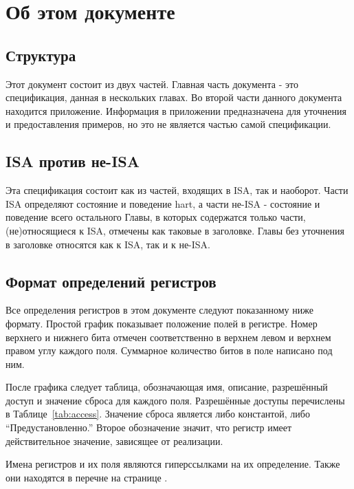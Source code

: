 \section{Об этом документе}

\subsection{Структура}

Этот документ состоит из двух частей. Главная часть документа - это
спецификация, данная в нескольких главах. Во второй части данного документа
находится приложение. Информация в приложении предназначена для уточнения
и предоставления примеров, но это не является частью самой спецификации.

\subsection{ISA против не-ISA}

Эта спецификация состоит как из частей, входящих в ISA, так и наоборот.
Части ISA определяют состояние и поведение hart, а части не-ISA - состояние и поведение
всего остального
Главы, в которых содержатся только части, (не)относящиеся к ISA, отмечены как таковые
в заголовке. Главы без уточнения в заголовке относятся как к ISA, так и к не-ISA.

\subsection{Формат определений регистров}

Все определения регистров в этом документе следуют показанному ниже формату.
Простой график показывает положение полей в регистре. Номер верхнего и нижнего бита
отмечен соответственно в верхнем левом и верхнем правом углу каждого поля. Суммарное количество
битов в поле написано под ним.

После графика следует таблица, обозначающая имя, описание, разрешённый доступ и
значение сброса для каждого поля. Разрешённые доступы перечислены в Таблице~\ref{tab:access}.
Значение сброса является либо константой, либо ``Предустановленно.''
Второе обозначение значит, что регистр имеет действительное значение, зависящее
от реализации.

Имена регистров и их поля являются гиперссылками на их определение. Также они
находятся в перечне на странице \pageref{index}.



